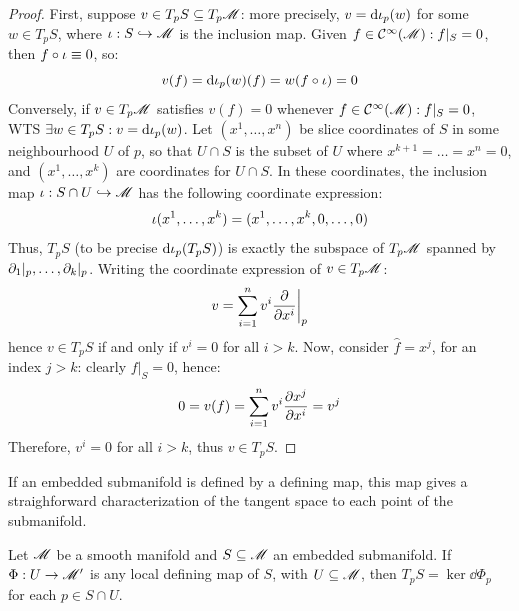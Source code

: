 \begin{proofbox}
  \begin{proof}
    First, suppose $ v \in T_pS \subseteq T_p\mathscr{M} $: more precisely, $ v = \mathrm{d} \iota_p(w) $ for some $ w \in T_pS $, where $ \iota : S \hookrightarrow \mathscr{M} $ is the inclusion map. Given $ f \in \mathcal{C}^{\infty}(\mathscr{M}) : f \vert_S = 0 $, then $ f \circ \iota \equiv 0 $, so:
    \begin{equation*}
      v(f) = \mathrm{d} \iota_p(w)(f) = w(f \circ \iota) = 0
    \end{equation*}
    Conversely, if $ v \in T_p\mathscr{M} $ satisfies $ v(f) = 0 $ whenever $ f \in \mathcal{C}^{\infty}(\mathscr{M}) : f \vert_S = 0 $, WTS $ \exists w \in T_pS : v = \mathrm{d} \iota_p(w) $. Let $ (x^1 , \dots , x^n) $ be slice coordinates of $ S $ in some neighbourhood $ U $ of $ p $, so that $ U \cap S $ is the subset of $ U $ where $ x^{k+1} = \dots = x^n = 0 $, and $ (x^1 , \dots , x^k) $ are coordinates for $ U \cap S $. In these coordinates, the inclusion map $ \iota : S \cap U \hookrightarrow \mathscr{M} $ has the following coordinate expression:
    \begin{equation*}
      \iota(x^1 , \dots , x^k) = (x^1 , \dots , x^k , 0 , \dots , 0)
    \end{equation*}
    Thus, $ T_pS $ (to be precise $ \mathrm{d} \iota_p(T_pS) $) is exactly the subspace of $ T_p\mathscr{M} $ spanned by $ \partial_1 \vert_p , \dots , \partial_k \vert_p $. Writing the coordinate expression of $ v \in T_p\mathscr{M} $:
    \begin{equation*}
      v = \sum_{i = 1}^n v^i \frac{\partial}{\partial x^i} \bigg\vert_p
    \end{equation*}
    hence $ v \in T_pS $ if and only if $ v^i = 0 $ for all $ i > k $. Now, consider $ \hat{f} = x^j $, for an index $ j > k $: clearly $ f \vert_S = 0 $, hence:
    \begin{equation*}
      0 = v(f) = \sum_{i = 1}^n v^i \frac{\partial x^j}{\partial x^i} = v^j
    \end{equation*}
    Therefore, $ v^i = 0 $ for all $ i > k $, thus $ v \in T_pS $.
  \end{proof}
\end{proofbox}

If an embedded submanifold is defined by a defining map, this map gives a straighforward characterization of the tangent space to each point of the submanifold.

\begin{proposition}{}{}
  Let $ \mathscr{M} $ be a smooth manifold and $ S \subseteq \mathscr{M} $ an embedded submanifold. If $ \Phi : U \rightarrow \mathscr{M}' $ is any local defining map of $ S $, with $ U \subseteq \mathscr{M} $, then $ T_pS = \ker \dd \Phi_p $ for each $ p \in S \cap U $.
\end{proposition}

